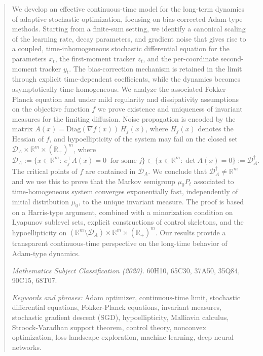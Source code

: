 \documentclass[11pt, a4paper,leqno]{amsart}
\theoremstyle{definition}
\numberwithin{equation}{section}
\newcommand{\R}{\mathbb R}
\begin{document}
\begin{abstract}
We develop an effective continuous-time model for the long-term dynamics of adaptive stochastic optimization, focusing on bias-corrected Adam-type methods. Starting from a finite-sum setting, we identify a canonical scaling of the learning rate, decay parameters, and gradient noise that gives rise to a coupled, time-inhomogeneous stochastic differential equation for the parameters $x_t$, the first-moment tracker $z_t$, and the per-coordinate second-moment tracker $y_t$. The bias-correction mechanism is retained in the limit through explicit time-dependent coefficients, while the dynamics becomes asymptotically time-homogeneous. We analyze the associated Fokker-Planck equation and under mild regularity
and dissipativity assumptions on the objective function $f$ we prove existence and uniqueness
of invariant measures for the limiting diffusion. Noise propagation is encoded by the matrix $A(x)=\mathrm{Diag}(\nabla f(x))\,H_f(x)$, where $H_f(x)$ denotes the Hessian of $f$, and hypoellipticity of the system may fail on the closed set $\mathcal D_A
\times\mathbb R^m\times(\mathbb R_+)^m$, where $$\mathcal D_A:=
\{x\in\mathbb R^m:\ e_j^\top A(x)=0
\ \mbox{ for some } j\}\subset \{x\in\R^m:\det A(x)=0\}:=\mathcal D_A^\dagger.$$  The critical points of $f$ are contained in $\mathcal D_A$. We conclude that  $\mathcal D_A^\dagger\neq \mathbb R^m$ and we use this to prove that the Markov semigroup $\mu_0P_t$ associated to time-homogeneous system converges exponentially fast, independently of initial distribution $\mu_0$,  to the unique invariant measure. The proof is based on a Harris-type argument, combined with
a minorization condition on Lyapunov sublevel sets, explicit constructions of control skeletons, and the hypoellipticity on $(\mathbb R^m\setminus \mathcal D_A)\times\mathbb R^m\times (\mathbb R_+)^m$. Our results provide a transparent continuous-time perspective on the long-time behavior of Adam-type dynamics.














\medskip





\noindent
{\em Mathematics Subject Classification (2020).} 60H10, 65C30, 37A50, 35Q84, 90C15, 68T07.



\medskip

\noindent\textit{Keywords and phrases:}
Adam optimizer, continuous-time limit, stochastic differential equations, Fokker-Planck equations, invariant measures, stochastic gradient descent (SGD), hypoellipticity, Malliavin calculus, Stroock-Varadhan support theorem, control theory, nonconvex optimization, loss landscape exploration, machine learning, deep neural networks.

\end{abstract}
\end{document}
